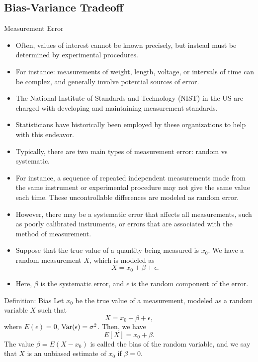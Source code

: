 \subsection{Bias-Variance Tradeoff}

\begin{frame}[allowframebreaks]{Measurement Error}

\begin{itemize}
  \item Often, values of interest cannot be known precisely, but instead must be determined by experimental procedures.
  \item For instance: measurements of weight, length, voltage, or intervals of time can be complex, and generally involve potential sources of error.
  \item The National Institute of Standards and Technology (NIST) in the US are charged with developing and maintaining measurement standards.
  \item Statisticians have historically been employed by these organizations to help with this endeavor.
  
  \framebreak 
  
  \item Typically, there are two main types of measurement error: \alert{random} vs \alert{systematic}.
  \item For instance, a sequence of repeated independent measurements made from the same instrument or experimental procedure may not give the same value each time. These uncontrollable differences are modeled as \alert{random} error. 
  \item However, there may be a \alert{systematic} error that affects all measurements, such as poorly calibrated instruments, or errors that are associated with the method of measurement.
  \item Suppose that the true value of a quantity being measured is $x_0$. We have a random measurement $X$, which is modeled as 
  $$
  X = x_0 + \beta + \epsilon.
  $$
  \item Here, $\beta$ is the systematic error, and $\epsilon$ is the random component of the error.
\end{itemize}
  \framebreak
  
  \begin{block}{Definition: Bias}
    Let $x_0$ be the true value of a measurement, modeled as a random variable $X$ such that
    $$
    X = x_0 + \beta + \epsilon,
    $$
    where $E(\epsilon) = 0$, $\mathrm{Var}(\epsilon) = \sigma^2$. Then, we have
    $$
    E[X] = x_0 + \beta.
    $$
    The value $\beta = E(X - x_0)$ is called the \alert{bias} of the random variable, and we say that $X$ is an unbiased estimate of $x_0$ if $\beta = 0$. 
  \end{block}
  

\end{frame}
